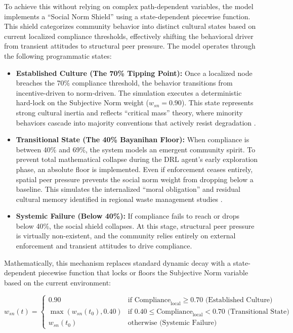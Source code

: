 To achieve this without relying on complex path-dependent variables, the model implements a ``Social Norm Shield'' using a state-dependent piecewise function. This shield categorizes community behavior into distinct cultural states based on current localized compliance thresholds, effectively shifting the behavioral driver from transient attitudes to structural peer pressure.  The model operates through the following programmatic states:

\begin{itemize}
    \item \textbf{Established Culture (The 70\% Tipping Point):} Once a localized node breaches the 70\% compliance threshold, the behavior transitions from incentive-driven to norm-driven. The simulation executes a deterministic hard-lock on the Subjective Norm weight ($w_{sn} = 0.90$). This state represents strong cultural inertia and reflects ``critical mass'' theory, where minority behaviors cascade into majority conventions that actively resist degradation \citep{Centola2018, Nyborg2016}.
    \item \textbf{Transitional State (The 40\% Bayanihan Floor):} When compliance is between 40\% and 69\%, the system models an emergent community spirit. To prevent total mathematical collapse during the DRL agent's early exploration phase, an absolute floor is implemented. Even if enforcement ceases entirely, spatial peer pressure prevents the social norm weight from dropping below a baseline. This simulates the internalized ``moral obligation'' and residual cultural memory identified in regional waste management studies \citep{Nishimura2022}.
    \item \textbf{Systemic Failure (Below 40\%):} If compliance fails to reach or drops below 40\%, the social shield collapses. At this stage, structural peer pressure is virtually non-existent, and the community relies entirely on external enforcement and transient attitudes to drive compliance.
\end{itemize}

Mathematically, this mechanism replaces standard dynamic decay with a state-dependent piecewise function that locks or floors the Subjective Norm variable based on the current environment:

\begin{equation}
    w_{sn}(t) = 
    \begin{cases} 
        0.90 & \text{if } \text{Compliance}_{\mathrm{local}} \ge 0.70 \text{ (Established Culture)} \\
        \max(w_{sn}(t_0), 0.40) & \text{if } 0.40 \le \text{Compliance}_{\mathrm{local}} < 0.70 \text{ (Transitional State)} \\
        w_{sn}(t_0) & \text{otherwise (Systemic Failure)}
    \end{cases}
\end{equation}

